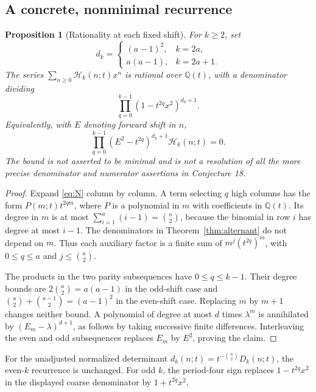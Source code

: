 \documentclass[11pt]{article}
\newtheorem{proposition}[theorem]{Proposition}
\theoremstyle{definition}
\theoremstyle{remark}
\newcommand{\Q}{\mathbb Q}
\newcommand{\Ht}{\mathcal H}
\numberwithin{equation}{section}
\begin{document}
\subsection{A concrete, nonminimal recurrence}
\begin{proposition}[Rationality at each fixed shift]
\label{prop:recurrence}
For $k\ge2$, set
\[
 d_k=\begin{cases}(a-1)^2,&k=2a,\\ a(a-1),&k=2a+1.\end{cases}
\]
The series $\sum_{n\ge0}\Ht_k(n;t)x^n$ is rational over $\Q(t)$,
with a denominator dividing
\begin{equation}
 \prod_{q=0}^{k-1}(1-t^{2q}x^2)^{d_k+1}.
 \label{eq:coarse-den}
\end{equation}
Equivalently, with $E$ denoting forward shift in $n$,
\begin{equation}
 \prod_{q=0}^{k-1}(E^2-t^{2q})^{d_k+1}\Ht_k(n;t)=0.
 \label{eq:coarse-rec}
\end{equation}
The bound is not asserted to be minimal and is not a resolution of all the
more precise denominator and numerator assertions in Conjecture 18.
\end{proposition}
\begin{proof}
Expand \eqref{eq:N} column by column. A term selecting $q$ high columns
has the form $P(m;t)t^{2qm}$, where $P$ is a polynomial in $m$ with
coefficients in $\Q(t)$. Its degree in $m$ is at most
$\sum_{i=1}^a(i-1)=\binom a2$, because the binomial in row $i$ has degree
at most $i-1$. The denominators in Theorem~\ref{thm:alternant} do not
depend on $m$. Thus each auxiliary factor is a finite sum of
$m^j(t^{2q})^m$, with $0\le q\le a$ and $j\le\binom a2$.

The products in the two parity subsequences have $0\le q\le k-1$.
Their degree bounds are $2\binom a2=a(a-1)$ in the odd-shift case and
$\binom a2+\binom{a-1}{2}=(a-1)^2$ in the even-shift case.
Replacing $m$ by $m+1$ changes neither bound. A polynomial of degree at
most $d$ times $\lambda^m$ is annihilated by $(E_m-\lambda)^{d+1}$,
as follows by taking successive finite differences. Interleaving the
even and odd subsequences replaces $E_m$ by $E^2$, proving the claim.
\end{proof}

For the unadjusted normalized determinant
$d_k(n;t)=t^{-\binom n2}D_k(n;t)$, the even-$k$ recurrence is unchanged.
For odd $k$, the period-four sign replaces $1-t^{2q}x^2$ in the displayed
coarse denominator by $1+t^{2q}x^2$.
\end{document}
